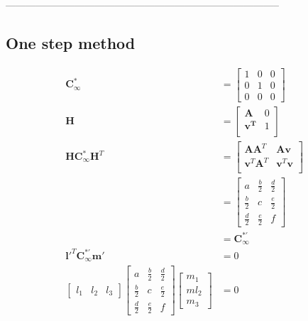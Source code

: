 \documentclass[11pt]{article}
\begin{document}
-----------------------------------------------------------------------------------

\subsection*{One step method}


\begin{align*}
\mathbf{C_{\infty}^*} &= 
\begin{bmatrix}
1 & 0 & 0\\
0 & 1 & 0 \\
0 & 0 & 0
\end{bmatrix} \\
\mathbf{H} &= 
\begin{bmatrix}
\mathbf{A} & 0\\
\mathbf{v^T}& 1\\
\end{bmatrix} \\
\mathbf{H}\mathbf{C_{\infty}^*}\mathbf{H}^T &= 
\begin{bmatrix}
\mathbf{A}\mathbf{A}^T & \mathbf{A}\mathbf{v}\\
\mathbf{v}^T\mathbf{A}^T & \mathbf{v}^T\mathbf{v}\\
\end{bmatrix} \\
 &=
\begin{bmatrix}
a & \frac{b}{2} & \frac{d}{2}\\
\frac{b}{2} & c & \frac{e}{2} \\
\frac{d}{2} & \frac{e}{2} & f
\end{bmatrix} \\
 &= \mathbf{C_{\infty}^{*'}} \\
 \mathbf{l'}^T\mathbf{C_{\infty}^{*'}}\mathbf{m'} &= 0 \\
\begin{bmatrix}
l_1 & l_2 & l_3
\end{bmatrix}
\begin{bmatrix}
a & \frac{b}{2} & \frac{d}{2}\\
\frac{b}{2} & c & \frac{e}{2} \\
\frac{d}{2} & \frac{e}{2} & f
\end{bmatrix} 
\begin{bmatrix}
m_1 \\ ml_2 \\ m_3
\end{bmatrix} &= 0\\
\end{align*}
\end{document}
